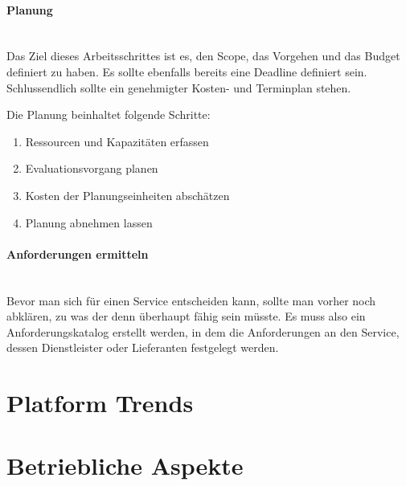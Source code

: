 \documentclass[a4paper, 11pt]{article}
\begin{document}
\paragraph{Planung}\mbox{}\\
Das Ziel dieses Arbeitsschrittes ist es, den Scope, das Vorgehen und das Budget definiert zu haben. Es sollte ebenfalls bereits eine Deadline definiert sein. Schlussendlich sollte ein genehmigter Kosten- und Terminplan stehen.

Die Planung beinhaltet folgende Schritte:

\begin{enumerate}
	\item Ressourcen und Kapazitäten erfassen
	\item Evaluationsvorgang planen
	\item Kosten der Planungseinheiten abschätzen
	\item Planung abnehmen lassen
\end{enumerate}

\paragraph{Anforderungen ermitteln}\mbox{}\\
Bevor man sich für einen Service entscheiden kann, sollte man vorher noch abklären, zu was der denn überhaupt fähig sein müsste. Es muss also ein Anforderungskatalog erstellt werden, in dem die Anforderungen an den Service, dessen Dienstleister oder Lieferanten festgelegt werden.


\section{Platform Trends}

\section{Betriebliche Aspekte}
\end{document}
